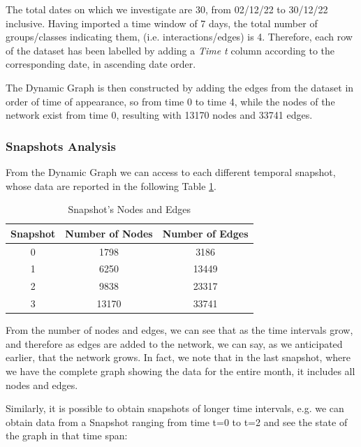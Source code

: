 \documentclass[sigchi]{acmart}
\begin{document}
The total dates on which we investigate are 30, from 02/12/22 to 30/12/22 inclusive.
Having imported a time window of 7 days, the total number of groups/classes indicating them, (i.e. interactions/edges) is 4. Therefore, each row of the dataset has been labelled by adding a \textit{Time t} column according to the corresponding date, in ascending date order.

The Dynamic Graph is then constructed by adding the edges from the dataset in order of time of appearance, so from time 0 to time 4, while the nodes of the network exist from time 0, resulting with 13170 nodes and 33741 edges.

\subsubsection{Snapshots Analysis} From the Dynamic Graph we can access to each different temporal snapshot, whose data are reported in the following Table \ref{tab:Snapshots Nodes and Edges}.


\begin{table}[htbp]
\centering
\caption{Snapshot's Nodes and Edges}
\label{tab:Snapshots Nodes and Edges}
\begin{tabular}{|c|c|c|}
\hline
\centering
    Snapshot & Number of Nodes & Number of Edges \\
    \hline
    0 & 1798 & 3186 \\
    1 & 6250 & 13449 \\
    2 & 9838 & 23317 \\
    3 & 13170 & 33741 \\
\hline
\end{tabular}
\end{table}

\vspace{1pt} %
From the number of nodes and edges, we can see that as the time intervals grow, and therefore as edges are added to the network, we can say, as we anticipated earlier, that the network grows. In fact, we note that in the last snapshot, where we have the complete graph showing the data for the entire month, it includes all nodes and edges.


\noindent Similarly, it is possible to obtain snapshots of longer time intervals, e.g. we can obtain data from a Snapshot ranging from time t=0 to t=2 and see the state of the graph in that time span:

\vspace{5pt}
\end{document}
